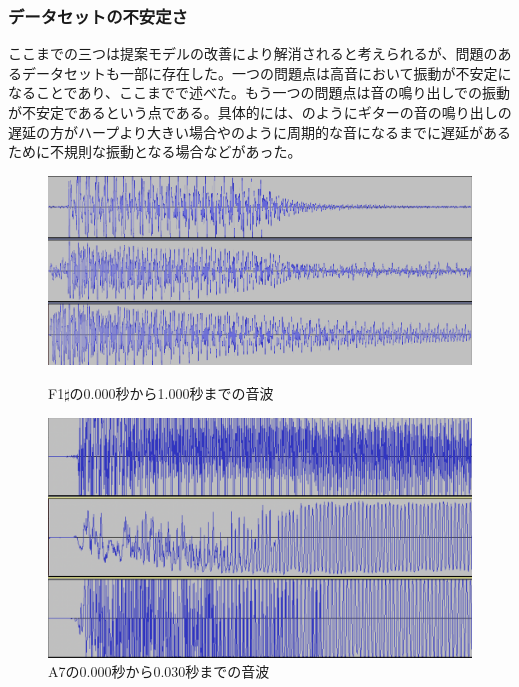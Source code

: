 \subsubsection{データセットの不安定さ}

ここまでの三つは提案モデルの改善により解消されると考えられるが、問題のあるデータセットも一部に存在した。一つの問題点は高音において振動が不安定になることであり、ここまでで述べた。もう一つの問題点は音の鳴り出しでの振動が不安定であるという点である。具体的には、のようにギターの音の鳴り出しの遅延の方がハープより大きい場合やのように周期的な音になるまでに遅延があるために不規則な振動となる場合などがあった。

\begin{figure}[b]
\centering
\begin{minipage}{0.48\columnwidth}
\centering
\includegraphics[width=0.9\columnwidth]{figure/88_88/f1s.png}
\caption[F1$\sharp$の音波]{F1$\sharp$の0.000秒から1.000秒までの音波}
\label{fig:88_88_lag1}
\end{minipage}
\begin{minipage}{0.48\columnwidth}
\centering
\includegraphics[width=0.75\columnwidth]{figure/88_88_det/a7_0_0030.png}
\caption[A7の音波]{A7の0.000秒から0.030秒までの音波}
\label{fig:88_88_lag2}
\end{minipage}
\end{figure}